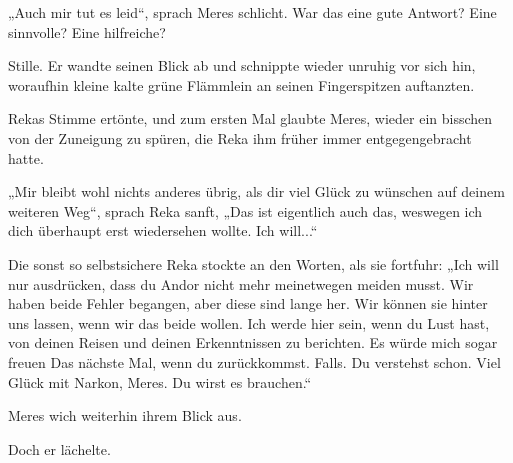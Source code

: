 „Auch mir tut es leid“, sprach Meres schlicht. War das eine gute Antwort? Eine sinnvolle? Eine hilfreiche?

Stille. Er wandte seinen Blick ab und schnippte wieder unruhig vor sich hin, woraufhin kleine kalte grüne Flämmlein an seinen Fingerspitzen auftanzten.

Rekas Stimme ertönte, und zum ersten Mal glaubte Meres, wieder ein bisschen von der Zuneigung zu spüren, die Reka ihm früher immer entgegengebracht hatte.

„Mir bleibt wohl nichts anderes übrig, als dir viel Glück zu wünschen auf deinem weiteren Weg“, sprach Reka sanft, „Das ist eigentlich auch das, weswegen ich dich überhaupt erst wiedersehen wollte. Ich will...“

Die sonst so selbstsichere Reka stockte an den Worten, als sie fortfuhr: „Ich will nur ausdrücken, dass du Andor nicht mehr meinetwegen meiden musst. Wir haben beide Fehler begangen, aber diese sind lange her. Wir können sie hinter uns lassen, wenn wir das beide wollen. Ich werde hier sein, wenn du Lust hast, von deinen Reisen und deinen Erkenntnissen zu berichten. Es würde mich sogar freuen Das nächste Mal, wenn du zurückkommst. Falls. Du verstehst schon. Viel Glück mit Narkon, Meres. Du wirst es brauchen.“

Meres wich weiterhin ihrem Blick aus.

Doch er lächelte.

